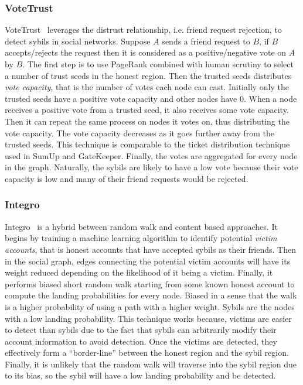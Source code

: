 \subsubsection{VoteTrust}
VoteTrust~\cite{xue2013votetrust} leverages the distrust relationship, i.e.
friend request rejection, to detect sybils in social networks. Suppose $A$ sends
a friend request to $B$, if $B$ accepts/rejects the request then it is
considered as a positive/negative vote on $A$ by $B$. The first step is to use
PageRank combined with human scrutiny to select a number of trust seeds in the
honest region. Then the trusted seeds distributes \emph{vote capacity}, that is
the number of votes each node can cast. Initially only the trusted seeds have a
positive vote capacity and other nodes have 0. When a node receives a positive
vote from a trusted seed, it also receives some vote capacity. Then it can
repeat the same process on nodes it votes on, thus distributing the vote
capacity. The vote capacity decreases as it goes further away from the trusted
seeds. This technique is comparable to the ticket distribution technique used in
SumUp and GateKeeper. Finally, the votes are aggregated for every node in the
graph. Naturally, the sybils are likely to have a low vote because their vote
capacity is low and many of their friend requests would be rejected.

\subsubsection{Integro}
Integro~\cite{boshmaf2015integro} is a hybrid between random walk and content
based approaches. It begins by training a machine learning algorithm to identify
potential \emph{victim accounts}, that is honest accounts that have accepted
sybils as their friends. Then in the social graph, edges connecting the
potential victim accounts will have its weight reduced depending on the
likelihood of it being a victim. Finally, it performs biased short random walk
starting from some known honest account to compute the landing probabilities for
every node. Biased in a sense that the walk is a higher probability of using a
path with a higher weight. Sybils are the nodes with a low landing probability.
This technique works because, victims are easier to detect than sybils due to
the fact that sybils can arbitrarily modify their account information to avoid
detection. Once the victims are detected, they effectively form a
``border-line'' between the honest region and the sybil region. Finally, it is
unlikely that the random walk will traverse into the sybil region due to its
bias, so the sybil will have a low landing probability and be detected.

